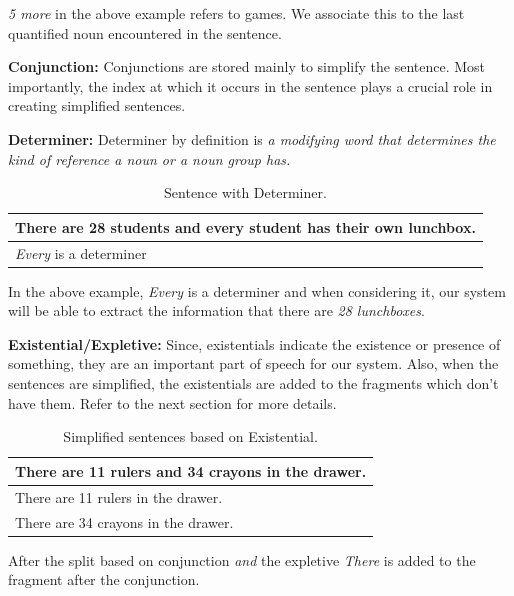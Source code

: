 \documentclass[11pt]{article}
\begin{document}
\textit{5 more} in the above example refers to games. We associate this to the last quantified noun encountered in the sentence.
\vspace{4mm}

\textbf{Conjunction:} Conjunctions are stored mainly to simplify the sentence. Most importantly, the index at which it occurs in the sentence plays a crucial role in creating simplified sentences.
\vspace{4mm}

\textbf{Determiner:} Determiner by definition is \textit{a modifying word that determines the kind of reference a noun or a noun group has.} 

\begin{table}[h!]
\centering
\begin{tabular}{ | m{25em} | }
\hline
\textbf{There are 28 students and every student has their own lunchbox.}\\
\hline
\textit{Every} is a determiner\\
\hline
\end{tabular}
\caption{Sentence with Determiner.}
\label{table:4}
\end{table}

In the above example, \textit{Every} is a determiner and when considering it, our system will be able to extract the information that there are \textit{28 lunchboxes}.
\vspace{4mm}

\textbf{Existential/Expletive:} Since, existentials indicate the existence or presence of something, they are an important part of speech for our system. Also, when the sentences are simplified, the existentials are added to the fragments which don't have them. Refer to the next section for more details.

\begin{table}[h!]
\centering
\begin{tabular}{ | m{25em} | }
\hline
\textbf{There are 11 rulers and 34 crayons in the drawer.}\\
\hline
There are 11 rulers in the drawer.\\
\hline
There are 34 crayons in the drawer.\\
\hline
\end{tabular}
\caption{Simplified sentences based on Existential.}
\label{table:5}
\end{table}

After the split based on conjunction \textit{and} the expletive \textit{There} is added to the fragment after the conjunction.
\vspace{4mm}
\end{document}
